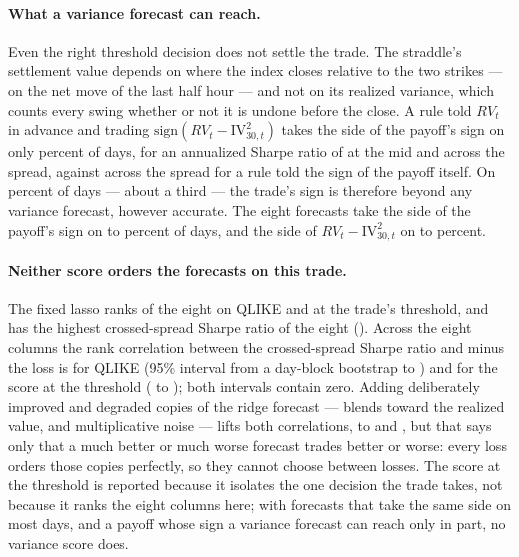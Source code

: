 \paragraph{What a variance forecast can reach.} Even the right threshold
decision does not settle the trade. The straddle's settlement value depends on
where the index closes relative to the two strikes --- on the net move of the
last half hour --- and not on its realized variance, which counts every swing
whether or not it is undone before the close. A rule told $RV_t$ in advance and
trading $\mathrm{sign}(RV_t - \mathrm{IV}^2_{30,t})$ takes the side of the
payoff's sign on only \murOracleAgree{} percent of days, for an annualized
Sharpe ratio of \murOracleShMid{} at the mid and \murOracleShX{} across the
spread, against \murPayoffOracleShX{} across the spread for a rule told the
sign of the payoff itself. On \murOracleMiss{} percent of days --- about a
third --- the trade's sign is therefore beyond any variance forecast, however
accurate. The eight forecasts take the side of the payoff's sign on
\murAgreePayMin{} to \murAgreePayMax{} percent of days, and the side of
$RV_t - \mathrm{IV}^2_{30,t}$ on \murHitVarMin{} to \murHitVarMax{} percent.

\paragraph{Neither score orders the forecasts on this trade.} The fixed lasso
ranks \murLassoFixedQLIKERank{} of the eight on QLIKE and
\murLassoFixedSliceRank{} at the trade's threshold, and has the highest
crossed-spread Sharpe ratio of the eight (\murLassoFixedShX{}). Across the
eight columns the rank correlation between the crossed-spread Sharpe ratio and
minus the loss is \murRhoQLIKE{} for QLIKE (95\% interval from a day-block
bootstrap \murRhoQLIKELo{} to \murRhoQLIKEHi{}) and \murRhoES{} for the score
at the threshold (\murRhoESLo{} to \murRhoESHi{}); both intervals contain zero.
Adding \murNLadder{} deliberately improved and degraded copies of the ridge
forecast --- blends toward the realized value, and multiplicative noise ---
lifts both correlations, to \murRhoUnionQLIKE{} and \murRhoUnionES{}, but that
says only that a much better or much worse forecast trades better or worse:
every loss orders those copies perfectly, so they cannot choose between losses.
The score at the threshold is reported because it isolates the one decision
the trade takes, not because it ranks the eight columns here; with
\murNForecasts{} forecasts that take the same side on most days, and a payoff
whose sign a variance forecast can reach only in part, no variance score does.

